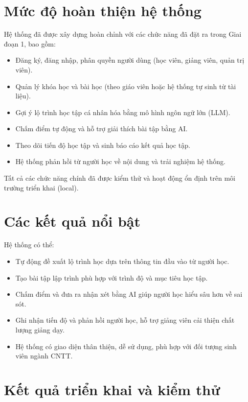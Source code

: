 \section{Mức độ hoàn thiện hệ thống}
Hệ thống đã được xây dựng hoàn chỉnh với các chức năng đã đặt ra trong Giai đoạn 1, bao gồm:

\begin{itemize}
	\item Đăng ký, đăng nhập, phân quyền người dùng (học viên, giảng viên, quản trị viên).
	\item Quản lý khóa học và bài học (theo giáo viên hoặc hệ thống tự sinh từ tài liệu).
	\item Gợi ý lộ trình học tập cá nhân hóa bằng mô hình ngôn ngữ lớn (LLM).
	\item Chấm điểm tự động và hỗ trợ giải thích bài tập bằng AI.
	\item Theo dõi tiến độ học tập và sinh báo cáo kết quả học tập.
	\item Hệ thống phản hồi từ người học về nội dung và trải nghiệm hệ thống.
\end{itemize}

Tất cả các chức năng chính đã được kiểm thử và hoạt động ổn định trên môi trường triển khai (local).

\section{Các kết quả nổi bật}
Hệ thống có thể:

\begin{itemize}
	\item Tự động đề xuất lộ trình học dựa trên thông tin đầu vào từ người học.
	\item Tạo bài tập lập trình phù hợp với trình độ và mục tiêu học tập.
	\item Chấm điểm và đưa ra nhận xét bằng AI giúp người học hiểu sâu hơn về sai sót.
	\item Ghi nhận tiến độ và phản hồi người học, hỗ trợ giảng viên cải thiện chất lượng giảng dạy.
	\item Hệ thống có giao diện thân thiện, dễ sử dụng, phù hợp với đối tượng sinh viên ngành CNTT.
\end{itemize}

\section{Kết quả triển khai và kiểm thử}


